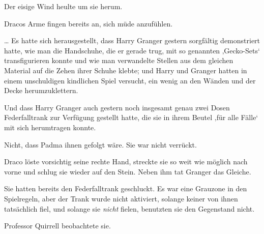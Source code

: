 \later

Der eisige Wind heulte um sie herum.

Dracos Arme fingen bereits an, sich müde anzufühlen.

… Es hatte sich herausgestellt, dass Harry Granger gestern sorgfältig demonstriert hatte, wie man die Handschuhe, die er gerade trug, mit so genannten ‚Gecko-Sets‘ transfigurieren konnte und wie man verwandelte Stellen aus dem gleichen Material auf die Zehen ihrer Schuhe klebte; und Harry und Granger hatten in einem unschuldigen kindlichen Spiel versucht, ein wenig an den Wänden und der Decke herumzuklettern.

Und dass Harry Granger auch gestern noch insgesamt genau zwei Dosen Federfalltrank zur Verfügung gestellt hatte, die sie in ihrem Beutel ‚für alle Fälle‘ mit sich herumtragen konnte.

Nicht, dass Padma ihnen gefolgt wäre. Sie war nicht verrückt.

Draco löste vorsichtig seine rechte Hand, streckte sie so weit wie möglich nach vorne und schlug sie wieder auf den Stein. Neben ihm tat Granger das Gleiche.

Sie hatten bereits den Federfalltrank geschluckt. Es war eine Grauzone in den Spielregeln, aber der Trank wurde nicht aktiviert, solange keiner von ihnen tatsächlich fiel, und solange sie \emph{nicht} fielen, benutzten sie den Gegenstand nicht.

Professor Quirrell beobachtete sie.

